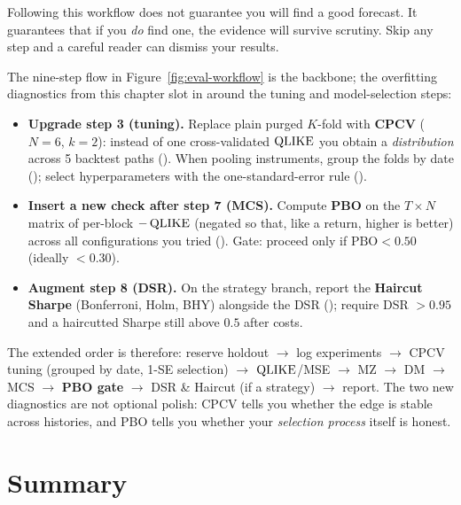 \begin{keyidea}
Following this workflow does not guarantee you will find a good forecast.
It guarantees that if you \emph{do} find one, the evidence will survive scrutiny.
Skip any step and a careful reader can dismiss your results.
\end{keyidea}



\begin{keyidea}
The nine-step flow in Figure~\ref{fig:eval-workflow} is the backbone; the overfitting diagnostics from this chapter slot in around the tuning and model-selection steps:
\begin{itemize}[nosep]
  \item \textbf{Upgrade step 3 (tuning).} Replace plain purged $K$-fold with \textbf{CPCV} ($N=6$, $k=2$): instead of one cross-validated $\operatorname{QLIKE}$ you obtain a \emph{distribution} across 5 backtest paths (). When pooling instruments, group the folds by date (); select hyperparameters with the one-standard-error rule ().
  \item \textbf{Insert a new check after step 7 (MCS).} Compute \textbf{PBO} on the $T \times N$ matrix of per-block $-\operatorname{QLIKE}$ (negated so that, like a return, higher is better) across all configurations you tried (). Gate: proceed only if $\text{PBO} < 0.50$ (ideally $< 0.30$).
  \item \textbf{Augment step 8 (DSR).} On the strategy branch, report the \textbf{Haircut Sharpe} (Bonferroni, Holm, BHY) alongside the DSR (); require DSR $> 0.95$ and a haircutted Sharpe still above $0.5$ after costs.
\end{itemize}
The extended order is therefore: reserve holdout $\rightarrow$ log experiments $\rightarrow$ CPCV tuning (grouped by date, 1-SE selection) $\rightarrow$ $\operatorname{QLIKE}$/MSE $\rightarrow$ MZ $\rightarrow$ DM $\rightarrow$ MCS $\rightarrow$ \textbf{PBO gate} $\rightarrow$ DSR \& Haircut (if a strategy) $\rightarrow$ report. The two new diagnostics are not optional polish: CPCV tells you whether the edge is stable across histories, and PBO tells you whether your \emph{selection process} itself is honest.
\end{keyidea}


\section{Summary}
\label{sec:eval-summary}

